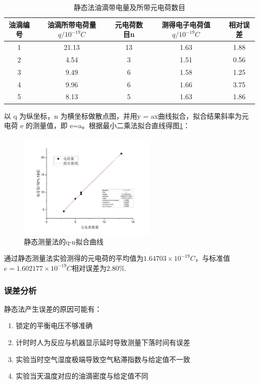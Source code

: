 \documentclass[12pt,a4paper,UTF8]{ctexart}
\begin{document}
\begin{table}[!h]
	\centering
	\caption{静态法油滴带电量及所带元电荷数目}	  
	\begin{tabular}{ccccc}
	\toprule
	油滴编号 & \makecell[c]{油滴所带电荷量\\$q/10^{-19}C$} & 元电荷数目n & \makecell[c]{测得电子电荷值\\$q/10^{-19}C$} & 相对误差\\
	\midrule
	1 & 21.13 & 13 & 1.63 & 1.88 \\
	2 & 4.54 & 3 & 1.51 & 0.56 \\
	3 & 9.49 & 6 & 1.58 & 1.25 \\
	4 & 9.96 & 6 & 1.66 & 3.75 \\
	5 & 8.13 & 5 & 1.63 & 1.86 \\
	\bottomrule
\end{tabular}%
\label{tab:3}
\end{table}%

以 q 为纵坐标，n 为横坐标做散点图，并用y = ax曲线拟合，拟合结果斜率为元电荷 e 的测量值，即 e=a。根据最小二乘法拟合直线得图\ref*{fig:1}：

\begin{figure}[!h]
	\centering
	\includegraphics[width=0.6\textwidth]{img//1.png}
	\caption{静态测量法的q-n拟合曲线}
	\label{fig:1}
\end{figure}

通过静态测量法实验测得的元电荷的平均值为$1.64703 \times 10^{-19}C$，与标准值$e =1.602177\times 10^{-19}C$相对误差为2.80\%.

\subsubsection*{误差分析}

静态法产生误差的原因可能有：

\begin{enumerate}
	\item 锁定的平衡电压不够准确
	\item 计时时人为反应与机器显示延时导致测量下落时间有误差
	\item 实验当时空气湿度极端导致空气粘滞指数与给定值不一致
	\item 实验当天温度对应的油滴密度与给定值不同
\end{enumerate}
\end{document}
